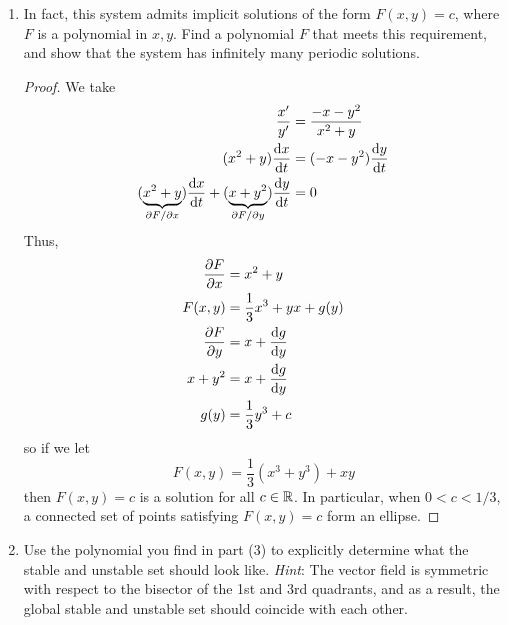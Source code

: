 \documentclass[../psets.tex]{subfiles}
\begin{document}
\begin{enumerate}
\begin{enumerate}
\begin{proof}
            \begin{equation*}
                B =
                \begin{pmatrix}
                    -1 & 2\\
                    -2 & 1\\
                \end{pmatrix}
            \end{equation*}
            with corresponding eigenvalues $\lambda=\pm i\sqrt{3}$. Therefore, as per the hint, nothing about stability can be said by the linearization.
        \end{proof}
        \item In fact, this system admits implicit solutions of the form $F(x,y)=c$, where $F$ is a polynomial in $x,y$. Find a polynomial $F$ that meets this requirement, and show that the system has infinitely many periodic solutions.
        \begin{proof}
            We take
            \begin{align*}
                \frac{x'}{y'} &= \frac{-x-y^2}{x^2+y}\\
                (x^2+y)\dv{x}{t} &= (-x-y^2)\dv{y}{t}\\
                (\underbrace{x^2+y}_{\pdv*{F}{x}})\dv{x}{t}+(\underbrace{x+y^2}_{\pdv*{F}{y}})\dv{y}{t} &= 0
            \end{align*}
            Thus,
            \begin{align*}
                \pdv{F}{x} &= x^2+y\\
                F(x,y) &= \frac{1}{3}x^3+yx+g(y)\\
                \pdv{F}{y} &= x+\dv{g}{y}\\
                x+y^2 &= x+\dv{g}{y}\\
                g(y) &= \frac{1}{3}y^3+c
            \end{align*}
            so if we let
            \begin{equation*}
                \boxed{F(x,y) = \frac{1}{3}(x^3+y^3)+xy}
            \end{equation*}
            then $F(x,y)=c$ is a solution for all $c\in\mathbb{R}$. In particular, when $0<c<1/3$, a connected set of points satisfying $F(x,y)=c$ form an ellipse.
        \end{proof}
        \item Use the polynomial you find in part (3) to explicitly determine what the stable and unstable set should look like. \emph{Hint}: The vector field is symmetric with respect to the bisector of the 1st and 3rd quadrants, and as a result, the global stable and unstable set should coincide with each other.

\end{enumerate}
\end{enumerate}
\end{document}
